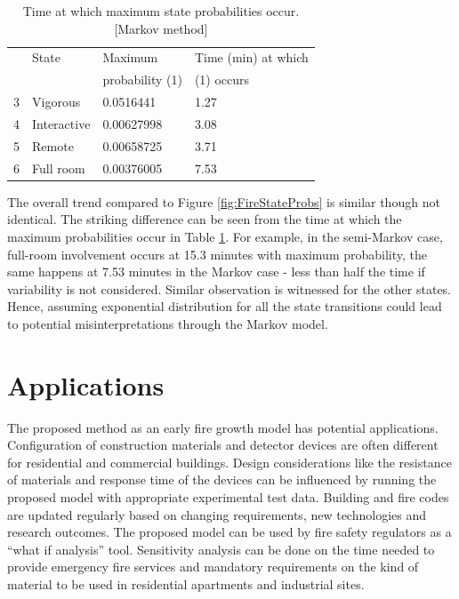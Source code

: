 \documentclass[12pt]{asme2ej}
\begin{document}
\begin{table}\centering
\caption{Time at which maximum state probabilities occur. [Markov method]\label{tbl:FireMaxProbsMarkov}}
\begin{tabular}{ l l l l}
	\hline
& State &	Maximum & Time (min) at which \\
&		& probability	(1)					&				 (1) occurs \\
	\hline
3 & Vigorous &		0.0516441	&	1.27	\\
4 & Interactive &   0.00627998 & 3.08	\\
5 & Remote & 0.00658725 & 3.71	\\
6 & Full room &    0.00376005 & 7.53	\\
  \hline
\end{tabular}
\end{table}

The overall trend compared to Figure \ref{fig:FireStateProbs} is similar though not identical. The striking difference can be seen from the time at which the maximum probabilities occur in Table \ref{tbl:FireMaxProbsMarkov}. For example, in the semi-Markov case, full-room involvement occurs at 15.3 minutes with maximum probability, the same happens at 7.53 minutes in the Markov case - less than half the time if variability is not considered. Similar observation is witnessed for the other states. Hence, assuming exponential distribution for all the state transitions could lead to potential misinterpretations through the Markov model.



\section{Applications}
The proposed method as an early fire growth model has potential applications. Configuration of construction materials and detector devices are often different for residential and commercial buildings. Design considerations like the resistance of materials and response time of the devices can be influenced by running the proposed model with appropriate experimental test data. Building and fire codes are updated regularly based on changing requirements, new technologies and research outcomes. The proposed model can be used by fire safety regulators as a ``what if analysis'' tool. Sensitivity analysis can be done on the time needed to provide emergency fire services and mandatory requirements on the kind of material to be used in residential apartments and industrial sites.
\end{document}
